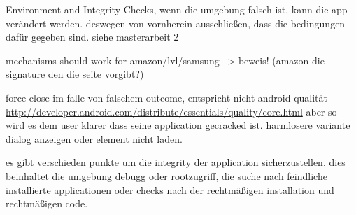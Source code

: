 Environment and Integrity Checks, wenn die umgebung falsch ist, kann die app verändert werden. deswegen von vornherein ausschließen, dass die bedingungen dafür gegeben sind.\newline
siehe masterarbeit 2\newline

mechanisms should work for amazon/lvl/samsung --> beweis! (amazon die signature den die seite vorgibt?)\newline

force close im falle von falschem outcome, entspricht nicht android qualität
\url{http://developer.android.com/distribute/essentials/quality/core.html} aber so wird es dem user klarer dass seine application gecracked ist. harmlosere variante dialog anzeigen oder element nicht laden.

es gibt verschieden punkte um die integrity der application sicherzustellen. dies beinhaltet die umgebung debugg oder rootzugriff, die suche nach feindliche installierte applicationen oder checks nach der rechtmäßigen installation und rechtmäßigen code.\newline
